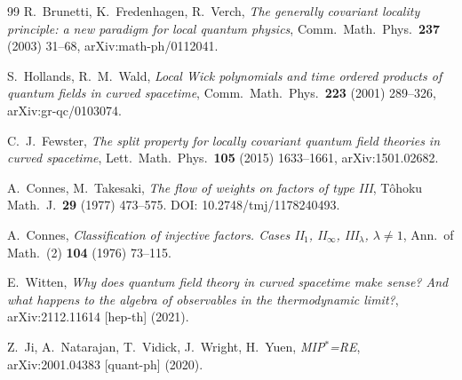 \documentclass[11pt]{article}
\theoremstyle{definition}
\begin{document}
\begin{thebibliography}{99}
R.\ Brunetti, K.\ Fredenhagen, R.\ Verch,
\emph{The generally covariant locality principle: a new paradigm for local
quantum physics},
Comm.\ Math.\ Phys.\ \textbf{237} (2003) 31--68,
arXiv:math-ph/0112041.

S.\ Hollands, R.\ M.\ Wald,
\emph{Local Wick polynomials and time ordered products of quantum fields in
curved spacetime},
Comm.\ Math.\ Phys.\ \textbf{223} (2001) 289--326,
arXiv:gr-qc/0103074.

C.\ J.\ Fewster,
\emph{The split property for locally covariant quantum field theories in
curved spacetime},
Lett.\ Math.\ Phys.\ \textbf{105} (2015) 1633--1661,
arXiv:1501.02682.

A.\ Connes, M.\ Takesaki,
\emph{The flow of weights on factors of type III},
T\^ohoku Math.\ J.\ \textbf{29} (1977) 473--575.
DOI: 10.2748/tmj/1178240493.

A.\ Connes,
\emph{Classification of injective factors. Cases II$_1$, II$_\infty$,
III$_\lambda$, $\lambda\neq 1$},
Ann.\ of Math.\ (2) \textbf{104} (1976) 73--115.

E.\ Witten,
\emph{Why does quantum field theory in curved spacetime make sense? And
what happens to the algebra of observables in the thermodynamic limit?},
arXiv:2112.11614 [hep-th] (2021).

Z.\ Ji, A.\ Natarajan, T.\ Vidick, J.\ Wright, H.\ Yuen,
\emph{MIP$^*$=RE},
arXiv:2001.04383 [quant-ph] (2020).

\end{thebibliography}
\end{document}
